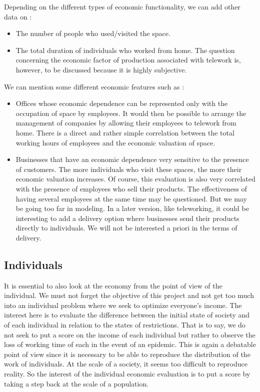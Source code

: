 Depending on the different types of economic functionality, we can add other data on :\\

\begin{itemize} 
\item The number of people who used/visited the space.
\item The total duration of individuals who worked from home. The question concerning the economic factor of production associated with telework is, however, to be discussed because it is highly subjective.\\
\end{itemize}

We can mention some different economic features such as :\\

\begin{itemize}
\item Offices whose economic dependence can be represented only with the occupation of space by employees. It would then be possible to arrange the management of companies by allowing their employees to telework from home. There is a direct and rather simple correlation between the total working hours of employees and the economic valuation of space.
\item Businesses that have an economic dependence very sensitive to the presence of customers. The more individuals who visit these spaces, the more their economic valuation increases. Of course, this evaluation is also very correlated with the presence of employees who sell their products. The effectiveness of having several employees at the same time may be questioned. But we may be going too far in modeling. In a later version, like teleworking, it could be interesting to add a delivery option where businesses send their products directly to individuals. We will not be interested a priori in the terms of delivery.\\
\end{itemize}

\subsection{Individuals}

It is essential to also look at the economy from the point of view of the individual. We must not forget the objective of this project and not get too much into an individual problem where we seek to optimize everyone's income. The interest here is to evaluate the difference between the initial state of society and of each individual in relation to the states of restrictions. That is to say, we do not seek to put a score on the income of each individual but rather to observe the loss of working time of each in the event of an epidemic. This is again a debatable point of view since it is necessary to be able to reproduce the distribution of the work of individuals. At the scale of a society, it seems too difficult to reproduce reality. So the interest of the individual economic evaluation is to put a score by taking a step back at the scale of a population.\\

